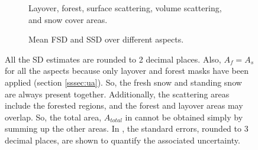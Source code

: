 \documentclass[review]{elsarticle}
\numberwithin{equation}{section}
\numberwithin{figure}{section}
\numberwithin{table}{section}
\begin{document}
\afterpage{\FloatBarrier}
\begin{figure}[!htbp]
    \centering
    \begin{subfigure}[t]{\textwidth}
        \caption{Layover, forest, surface scattering, volume scattering, and snow cover areas.}
        \label{subfig:area_aspect}
    \end{subfigure}
    \begin{subfigure}[t]{\textwidth}
        \caption{Mean FSD and SSD over different aspects.}
        \label{subfig:sd_aspect}
    \end{subfigure}
    \caption{All the SD estimates are rounded to 2 decimal places. Also, $A_f = A_s$ for all the aspects because only layover and forest masks have been applied (section \ref{sssec:ua}). So, the fresh snow and standing snow are always present together. Additionally, the scattering areas include the forested regions, and the forest and layover areas may overlap. So, the total area, $A_{total}$ in  cannot be obtained simply by summing up the other areas. In , the standard errors, rounded to 3 decimal places, are shown to quantify the associated uncertainty.}
    \label{fig:sa_aspect}
\end{figure}
\end{document}
